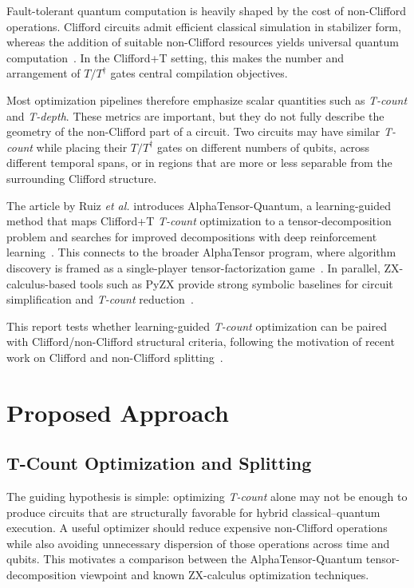 \documentclass[conference]{IEEEtran}
\newcommand{\atq}{AlphaTensor-Quantum}
\newcommand{\tcount}{\textit{T-count}}
\newcommand{\tdepth}{\textit{T-depth}}
\newcommand{\tdag}{T^{\dagger}}
\begin{document}
Fault-tolerant quantum computation is heavily shaped by the cost of non-Clifford operations. Clifford circuits admit efficient classical simulation in stabilizer form, whereas the addition of suitable non-Clifford resources yields universal quantum computation~\cite{aaronsonImprovedSimulationStabilizer2004,bravyiUniversalQuantumComputation2005,gilesExactSynthesisMultiqubit2013}. In the Clifford+T setting, this makes the number and arrangement of $T/\tdag$ gates central compilation objectives.

Most optimization pipelines therefore emphasize scalar quantities such as \tcount{} and \tdepth{}. These metrics are important, but they do not fully describe the geometry of the non-Clifford part of a circuit. Two circuits may have similar \tcount{} while placing their $T/\tdag$ gates on different numbers of qubits, across different temporal spans, or in regions that are more or less separable from the surrounding Clifford structure.

The article by Ruiz \textit{et al.} introduces \atq{}, a learning-guided method that maps Clifford+T \tcount{} optimization to a tensor-decomposition problem and searches for improved decompositions with deep reinforcement learning~\cite{ruizQuantumCircuitOptimization2025}. This connects to the broader AlphaTensor program, where algorithm discovery is framed as a single-player tensor-factorization game~\cite{fawziDiscoveringFasterMatrix2022}. In parallel, ZX-calculus-based tools such as PyZX provide strong symbolic baselines for circuit simplification and \tcount{} reduction~\cite{coeckeInteractingQuantumObservables2011,duncanGraphTheoreticSimplification2020,kissingerPyzxLargeScale2020,kissingerReducingNumberNonClifford2020}.

This report tests whether learning-guided \tcount{} optimization can be paired with Clifford/non-Clifford structural criteria, following the motivation of recent work on Clifford and non-Clifford splitting~\cite{limaCliffordNonCliffordSplitting2025}.

\section{Proposed Approach}

\subsection{T-Count Optimization and Splitting}

The guiding hypothesis is simple: optimizing \tcount{} alone may not be enough to produce circuits that are structurally favorable for hybrid classical--quantum execution. A useful optimizer should reduce expensive non-Clifford operations while also avoiding unnecessary dispersion of those operations across time and qubits. This motivates a comparison between the \atq{} tensor-decomposition viewpoint and known ZX-calculus optimization techniques.
\end{document}

